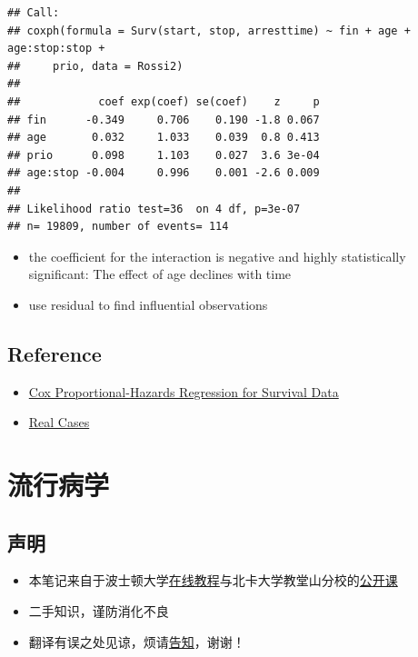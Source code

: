 \documentclass[]{book}
\providecommand{\tightlist}{%
  \setlength{\itemsep}{0pt}\setlength{\parskip}{0pt}}
\begin{document}
\begin{verbatim}
## Call:
## coxph(formula = Surv(start, stop, arresttime) ~ fin + age + age:stop:stop + 
##     prio, data = Rossi2)
## 
##            coef exp(coef) se(coef)    z     p
## fin      -0.349     0.706    0.190 -1.8 0.067
## age       0.032     1.033    0.039  0.8 0.413
## prio      0.098     1.103    0.027  3.6 3e-04
## age:stop -0.004     0.996    0.001 -2.6 0.009
## 
## Likelihood ratio test=36  on 4 df, p=3e-07
## n= 19809, number of events= 114
\end{verbatim}

\begin{itemize}
\item
  the coefficient for the interaction is negative and highly statistically significant: The effect of age declines with time
\item
  use residual to find influential observations
\end{itemize}

\hypertarget{reference}{%
\section{Reference}\label{reference}}

\begin{itemize}
\tightlist
\item
  \href{http://cran.r-project.org/doc/contrib/Fox-Companion/appendix-cox-regression.pdf}{Cox Proportional-Hazards Regression for Survival Data}
\item
  \href{http://ehp.niehs.nih.gov/1104049/}{Real Cases}
\end{itemize}

\hypertarget{epid}{%
\chapter{流行病学}\label{epid}}

\hypertarget{ux58f0ux660e}{%
\section{声明}\label{ux58f0ux660e}}

\begin{itemize}
\tightlist
\item
  本笔记来自于波士顿大学\href{http://sphweb.bumc.bu.edu/otlt/MPH-Modules/Modules_Menu.html}{在线教程}与北卡大学教堂山分校的\href{https://www.coursera.org/learn/epidemiology/outline}{公开课}
\item
  二手知识，谨防消化不良
\item
  翻译有误之处见谅，烦请\href{mailto:yufreecas@gmail.com}{告知}，谢谢！
\end{itemize}
\end{document}

